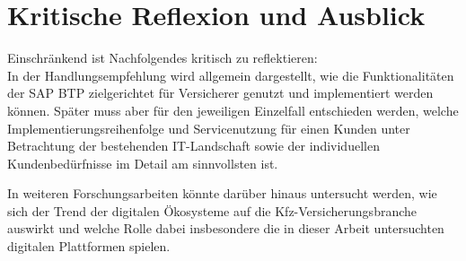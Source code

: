 \section{Kritische Reflexion und Ausblick}

Einschränkend ist Nachfolgendes kritisch zu reflektieren:\\
In der Handlungsempfehlung wird allgemein dargestellt, wie die Funktionalitäten der SAP BTP zielgerichtet für Versicherer genutzt und implementiert werden können. Später muss aber für den jeweiligen Einzelfall entschieden werden, welche Implementierungsreihenfolge und Servicenutzung für einen Kunden unter Betrachtung der bestehenden IT-Landschaft sowie der individuellen Kundenbedürfnisse im Detail am sinnvollsten ist.

In weiteren Forschungsarbeiten könnte darüber hinaus untersucht werden, wie sich der Trend der digitalen Ökosysteme auf die Kfz-Versicherungsbranche auswirkt und welche Rolle dabei insbesondere die in dieser Arbeit untersuchten digitalen Plattformen spielen.







